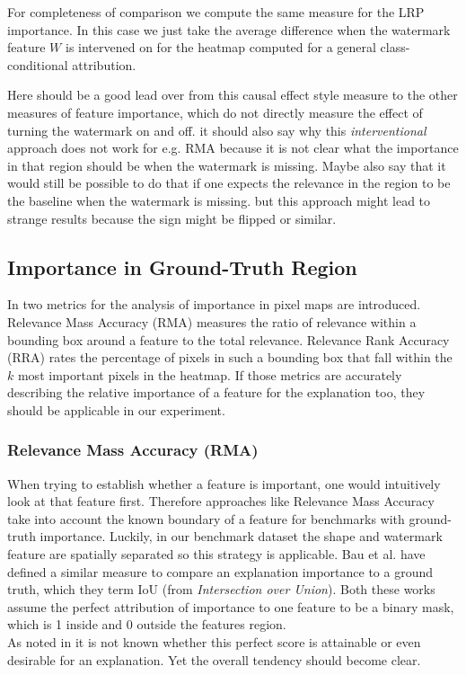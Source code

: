 For completeness of comparison we compute the same measure for the LRP importance. In this case we just take the average difference when the watermark feature $W$ is intervened on for the heatmap computed for a general class-conditional attribution. 

Here should be a good lead over from this causal effect style measure to the other measures of feature importance, which do not directly measure the effect of turning the watermark on and off. it should also say why this \textit{interventional} approach does not work for e.g. RMA because it is not clear what the importance in that region should be when the watermark is missing. Maybe also say that it would still be possible to do that if one expects the relevance in the region to be the baseline when the watermark is missing. but this approach might lead to strange results because the sign might be flipped or similar.

\subsection{Importance in Ground-Truth Region}
In \cite{Arras2022} two metrics for the analysis of importance in pixel maps are introduced. Relevance Mass Accuracy (RMA) measures the ratio of relevance within a bounding box around a feature to the total relevance. Relevance Rank Accuracy (RRA) rates the percentage of pixels in such a bounding box that fall within the $k$ most important pixels in the heatmap. If those metrics are accurately describing the relative importance of a feature for the explanation too, they should be applicable in our experiment. 

\subsubsection{Relevance Mass Accuracy (RMA)}
When trying to establish whether a feature is important, one would intuitively look at that feature first. Therefore approaches like Relevance Mass Accuracy take into account the known boundary of a feature for benchmarks with ground-truth importance. Luckily, in our benchmark dataset the shape and watermark feature are spatially separated so this strategy is applicable.
Bau et al. \cite{Bau2017, Bau2020} have defined a similar measure to compare an explanation importance to a ground truth, which they term IoU (from \textit{Intersection over Union}). Both these works assume the perfect attribution of importance to one feature to be a binary mask, which is 1 inside and 0 outside the features region. \\
As noted in \cite{Arras2022} it is not known whether this perfect score is attainable or even desirable for an explanation. Yet the overall tendency should become clear.

